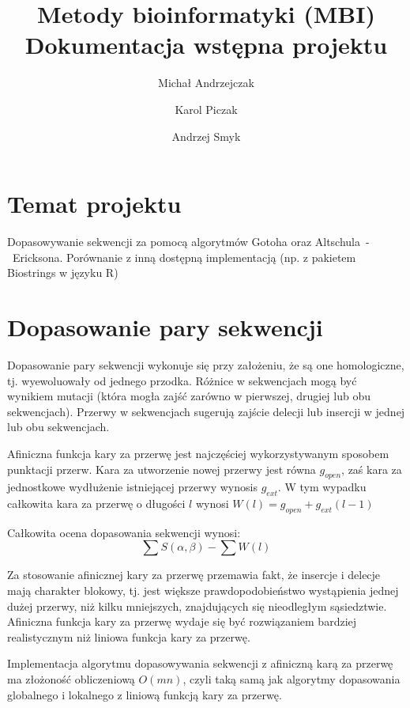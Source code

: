 \documentclass[a4paper,10pt]{article}
\title{Metody bioinformatyki (MBI)\\Dokumentacja wstępna projektu}
\author{Michał Andrzejczak
		\and
		Karol Piczak
		\and
		Andrzej Smyk
		}
\begin{document}
	\maketitle
	\section{Temat projektu}

	\indent Dopasowywanie sekwencji za pomocą algorytmów Gotoha oraz \linebreak\mbox{Altschula - Ericksona}. Porównanie z inną dostępną implementacją (np. z pakietem Biostrings w języku R)

	\section{Dopasowanie pary sekwencji}

	Dopasowanie pary sekwencji wykonuje się przy założeniu, że są one homologiczne, tj. wyewoluowały od jednego przodka. Różnice w sekwencjach mogą być wynikiem mutacji (która mogła zajść zarówno w pierwszej, drugiej lub obu sekwencjach). Przerwy w sekwencjach sugerują zajście delecji lub insercji w jednej lub obu sekwencjach.

	Afiniczna funkcja kary za przerwę jest najczęściej wykorzystywanym sposobem punktacji przerw. Kara za utworzenie nowej przerwy jest równa $g_{open}$, zaś kara za jednostkowe wydłużenie istniejącej przerwy wynosis $g_{ext}$. W tym wypadku całkowita kara za przerwę o długości $l$ wynosi \mbox{$W(l) = g_{open} + g_{ext}(l - 1)$}

	Całkowita ocena dopasowania sekwencji wynosi:
	\[\sum S(\alpha, \beta) - \sum W(l) \]

	Za stosowanie afinicznej kary za przerwę przemawia fakt, że insercje i delecje mają charakter blokowy, tj. jest większe prawdopodobieństwo wystąpienia jednej dużej przerwy, niż kilku mniejszych, znajdujących się nieodległym sąsiedztwie. Afiniczna funkcja kary za przerwę wydaje się być rozwiązaniem bardziej realistycznym niż liniowa funkcja kary za przerwę.

	Implementacja algorytmu dopasowywania sekwencji z afiniczną karą za przerwę ma złożoność obliczeniową $O(mn)$, czyli taką samą jak algorytmy dopasowania globalnego i lokalnego z liniową funkcją kary za przerwę.
\end{document}
